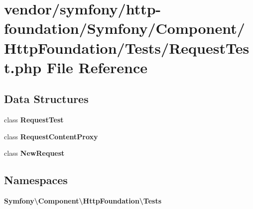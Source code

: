 \section{vendor/symfony/http-\/foundation/\+Symfony/\+Component/\+Http\+Foundation/\+Tests/\+Request\+Test.php File Reference}
\label{_request_test_8php}
\subsection*{Data Structures}
\begin{DoxyCompactItemize}
\item 
class {\bf Request\+Test}
\item 
class {\bf Request\+Content\+Proxy}
\item 
class {\bf New\+Request}
\end{DoxyCompactItemize}
\subsection*{Namespaces}
\begin{DoxyCompactItemize}
\item 
 {\bf Symfony\textbackslash{}\+Component\textbackslash{}\+Http\+Foundation\textbackslash{}\+Tests}
\end{DoxyCompactItemize}
